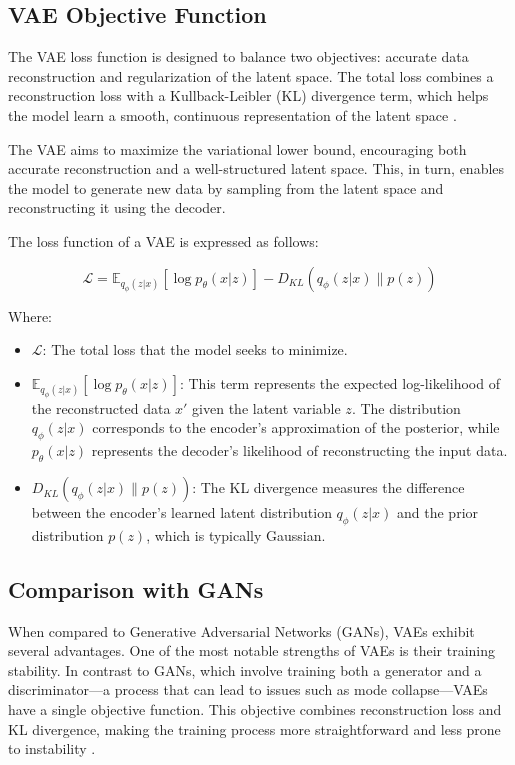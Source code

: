 \subsection{VAE Objective Function}
The VAE loss function is designed to balance two objectives: accurate data reconstruction and regularization of the latent space. The total loss combines a reconstruction loss with a Kullback-Leibler (KL) divergence term, which helps the model learn a smooth, continuous representation of the latent space \citep{10.3390/jimaging4020036}.

The VAE aims to maximize the variational lower bound, encouraging both accurate reconstruction and a well-structured latent space. This, in turn, enables the model to generate new data by sampling from the latent space and reconstructing it using the decoder.

The loss function of a VAE is expressed as follows:

\begin{equation}
\mathcal{L} = \mathbb{E}_{q_\phi(z|x)}[\log p_\theta(x|z)] - D_{KL}(q_\phi(z|x) \| p(z))
\end{equation}

Where:
\begin{itemize}
    \item \(\mathcal{L}\): The total loss that the model seeks to minimize.
    \item \(\mathbb{E}_{q_\phi(z|x)}[\log p_\theta(x|z)]\): This term represents the expected log-likelihood of the reconstructed data \(x'\) given the latent variable \(z\). The distribution \(q_\phi(z|x)\) corresponds to the encoder's approximation of the posterior, while \(p_\theta(x|z)\) represents the decoder's likelihood of reconstructing the input data.
    \item \(D_{KL}(q_\phi(z|x) \| p(z))\): The KL divergence measures the difference between the encoder's learned latent distribution \(q_\phi(z|x)\) and the prior distribution \(p(z)\), which is typically Gaussian.
\end{itemize}

\subsection{Comparison with GANs}

When compared to Generative Adversarial Networks (GANs), VAEs exhibit several advantages. One of the most notable strengths of VAEs is their training stability. In contrast to GANs, which involve training both a generator and a discriminator—a process that can lead to issues such as mode collapse—VAEs have a single objective function. This objective combines reconstruction loss and KL divergence, making the training process more straightforward and less prone to instability \citep{10.1561/2200000056}.

